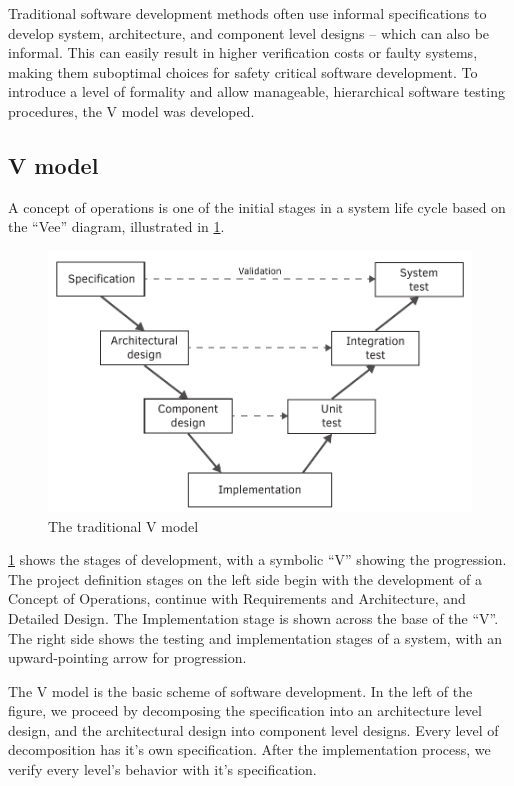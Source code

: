 Traditional software development methods often use informal specifications to develop system, architecture, and component level designs -- which can also be informal. This can easily result in higher verification costs or faulty systems, making them suboptimal choices for safety critical software development. To introduce a level of formality and allow manageable, hierarchical software testing procedures, the V model was developed.

\subsection{V model}

A concept of operations is one of the initial stages in a system life cycle based on the “Vee” diagram, illustrated in \cref{fig:intro:vmodel}.

\begin{figure}[h]
	\centering
	\includegraphics[width=0.8\linewidth]{include/figures/chapter_1/vmodel}
	\caption{The traditional V model \cite{vmodel}}
	\label{fig:intro:vmodel}
\end{figure}

\cref{fig:intro:vmodel} shows the stages of development, with a symbolic “V” showing the progression. The project definition stages on the left side begin with the development of a Concept of Operations, continue with Requirements and Architecture, and Detailed Design. The Implementation stage is shown across the base of the ``V''. The right side shows the testing and implementation stages of a system, with an upward-pointing arrow for progression. \cite{vmodel}

The V model is the basic scheme of software development. In the left of the figure, we proceed by decomposing the specification into an architecture level design, and the architectural design into component level designs. Every level of decomposition has it's own specification. After the implementation process, we verify every level's behavior with it's specification.

